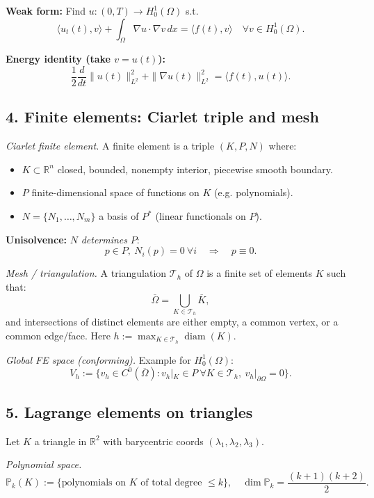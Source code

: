 \textbf{Weak form:} Find $u:(0,T)\to H_0^1(\Omega)$ s.t.
\[
    \langle u_t(t),v\rangle + \int_\Omega \nabla u\cdot\nabla v\,dx
    = \langle f(t),v\rangle
    \quad\forall v\in H_0^1(\Omega).
\]

\textbf{Energy identity (take $v=u(t)$):}
\[
    \frac12\frac{d}{dt}\|u(t)\|_{L^2}^2 + \|\nabla u(t)\|_{L^2}^2
    = \langle f(t),u(t)\rangle.
\]

\subsection*{4. Finite elements: Ciarlet triple and mesh}

\emph{Ciarlet finite element.}
A finite element is a triple $(K,P,N)$ where:
\begin{itemize}
    \item $K\subset\mathbb{R}^n$ closed, bounded, nonempty interior, piecewise smooth boundary.
    \item $P$ finite-dimensional space of functions on $K$ (e.g. polynomials).
    \item $N=\{N_1,\dots,N_m\}$ a basis of $P^\ast$ (linear functionals on $P$).
\end{itemize}
\textbf{Unisolvence:} $N$ \emph{determines} $P$:
\[
    p\in P,\ N_i(p)=0\ \forall i \quad\Rightarrow\quad p\equiv 0.
\]

\emph{Mesh / triangulation.}
A triangulation $\mathcal{T}_h$ of $\Omega$ is a finite set of elements $K$ such that:
\[
    \overline{\Omega} = \bigcup_{K\in\mathcal{T}_h}\overline{K},
\]
and intersections of distinct elements are either empty, a common vertex, or a common edge/face.
Here $h:=\max_{K\in\mathcal{T}_h}\operatorname{diam}(K)$.

\emph{Global FE space (conforming).}
Example for $H_0^1(\Omega)$:
\[
    V_h := \{v_h\in C^0(\overline{\Omega}) : v_h|_K\in P\ \forall K\in\mathcal{T}_h,\
    v_h|_{\partial\Omega}=0\}.
\]

\subsection*{5. Lagrange elements on triangles}

Let $K$ a triangle in $\mathbb{R}^2$ with barycentric coords $(\lambda_1,\lambda_2,\lambda_3)$.

\emph{Polynomial space.}
\[
    \mathbb{P}_k(K) := \{\text{polynomials on }K \text{ of total degree }\le k\},\quad
    \dim \mathbb{P}_k = \frac{(k+1)(k+2)}{2}.
\]

